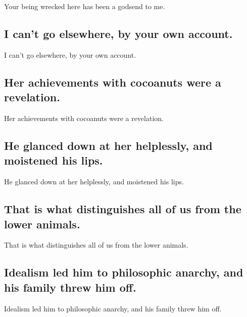 \documentclass[]{article}
\begin{document}
Your being wrecked here has been a godsend to me.

\hypertarget{i-cant-go-elsewhere-by-your-own-account.}{%
\subsection{I can't go elsewhere, by your own
account.}\label{i-cant-go-elsewhere-by-your-own-account.}}

I can't go elsewhere, by your own account.

\hypertarget{her-achievements-with-cocoanuts-were-a-revelation.}{%
\subsection{Her achievements with cocoanuts were a
revelation.}\label{her-achievements-with-cocoanuts-were-a-revelation.}}

Her achievements with cocoanuts were a revelation.

\hypertarget{he-glanced-down-at-her-helplessly-and-moistened-his-lips.}{%
\subsection{He glanced down at her helplessly, and moistened his
lips.}\label{he-glanced-down-at-her-helplessly-and-moistened-his-lips.}}

He glanced down at her helplessly, and moistened his lips.

\hypertarget{that-is-what-distinguishes-all-of-us-from-the-lower-animals.}{%
\subsection{That is what distinguishes all of us from the lower
animals.}\label{that-is-what-distinguishes-all-of-us-from-the-lower-animals.}}

That is what distinguishes all of us from the lower animals.

\hypertarget{idealism-led-him-to-philosophic-anarchy-and-his-family-threw-him-off.}{%
\subsection{Idealism led him to philosophic anarchy, and his family
threw him
off.}\label{idealism-led-him-to-philosophic-anarchy-and-his-family-threw-him-off.}}

Idealism led him to philosophic anarchy, and his family threw him off.
\end{document}
